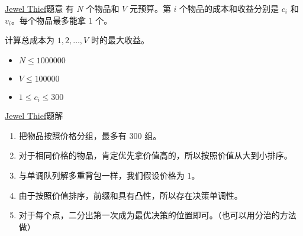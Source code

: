 \documentclass{beamer}
\begin{document}
\begin{frame}{\href{https://open.kattis.com/problems/thief}{Jewel Thief}}{题意}
有 $N$ 个物品和 $V$ 元预算。第 $i$ 个物品的成本和收益分别是 $c_i$ 和 $v_i$。每个物品最多能拿 $1$ 个。

计算总成本为 $1,2,\ldots ,V$ 时的最大收益。
\begin{itemize}
    \item $ N \le 1000000$
    \item $ V \le 100000$
    \item $ 1\le c_i \le 300$
\end{itemize}

\end{frame}
\begin{frame}{\href{https://open.kattis.com/problems/thief}{Jewel Thief}}{题解}

\begin{enumerate}
    \item 把物品按照价格分组，最多有 $300$ 组。
    \item 对于相同价格的物品，肯定优先拿价值高的，所以按照价值从大到小排序。
    \item 与单调队列解多重背包一样，我们假设价格为 $1$。
    \item 由于按照价值排序，前缀和具有凸性，所以存在决策单调性。
    \item 对于每个点，二分出第一次成为最优决策的位置即可。（也可以用分治的方法做）
\end{enumerate}
\end{frame}
\end{document}
